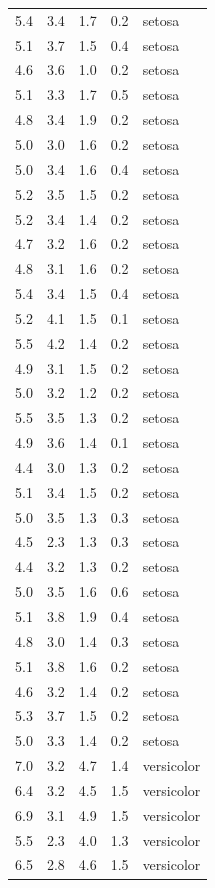 \documentclass[
  letterpaper,
  DIV=11,
  numbers=noendperiod,
  oneside]{scrreprt}
\begin{document}
\begin{longtable}[]{@{}rrrrl@{}}
5.4 & 3.4 & 1.7 & 0.2 & setosa \\
5.1 & 3.7 & 1.5 & 0.4 & setosa \\
4.6 & 3.6 & 1.0 & 0.2 & setosa \\
5.1 & 3.3 & 1.7 & 0.5 & setosa \\
4.8 & 3.4 & 1.9 & 0.2 & setosa \\
5.0 & 3.0 & 1.6 & 0.2 & setosa \\
5.0 & 3.4 & 1.6 & 0.4 & setosa \\
5.2 & 3.5 & 1.5 & 0.2 & setosa \\
5.2 & 3.4 & 1.4 & 0.2 & setosa \\
4.7 & 3.2 & 1.6 & 0.2 & setosa \\
4.8 & 3.1 & 1.6 & 0.2 & setosa \\
5.4 & 3.4 & 1.5 & 0.4 & setosa \\
5.2 & 4.1 & 1.5 & 0.1 & setosa \\
5.5 & 4.2 & 1.4 & 0.2 & setosa \\
4.9 & 3.1 & 1.5 & 0.2 & setosa \\
5.0 & 3.2 & 1.2 & 0.2 & setosa \\
5.5 & 3.5 & 1.3 & 0.2 & setosa \\
4.9 & 3.6 & 1.4 & 0.1 & setosa \\
4.4 & 3.0 & 1.3 & 0.2 & setosa \\
5.1 & 3.4 & 1.5 & 0.2 & setosa \\
5.0 & 3.5 & 1.3 & 0.3 & setosa \\
4.5 & 2.3 & 1.3 & 0.3 & setosa \\
4.4 & 3.2 & 1.3 & 0.2 & setosa \\
5.0 & 3.5 & 1.6 & 0.6 & setosa \\
5.1 & 3.8 & 1.9 & 0.4 & setosa \\
4.8 & 3.0 & 1.4 & 0.3 & setosa \\
5.1 & 3.8 & 1.6 & 0.2 & setosa \\
4.6 & 3.2 & 1.4 & 0.2 & setosa \\
5.3 & 3.7 & 1.5 & 0.2 & setosa \\
5.0 & 3.3 & 1.4 & 0.2 & setosa \\
7.0 & 3.2 & 4.7 & 1.4 & versicolor \\
6.4 & 3.2 & 4.5 & 1.5 & versicolor \\
6.9 & 3.1 & 4.9 & 1.5 & versicolor \\
5.5 & 2.3 & 4.0 & 1.3 & versicolor \\
6.5 & 2.8 & 4.6 & 1.5 & versicolor \\

\end{longtable}
\end{document}
